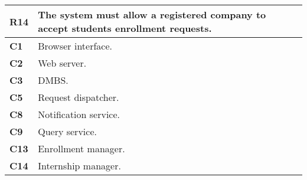 \begin{table}[H]
    \centering
    \begin{tabular}{|l|m{10cm}|}
        \hline \textbf{R14} & The system must allow a registered company to accept students enrollment requests.\\
        \hline \textbf{C1} & Browser interface. \\
        \hline \textbf{C2} & Web server. \\
        \hline \textbf{C3} & DMBS. \\
        \hline \textbf{C5} & Request dispatcher. \\
        \hline \textbf{C8} & Notification service. \\
        \hline \textbf{C9} & Query service. \\
        \hline \textbf{C13} & Enrollment manager. \\
        \hline \textbf{C14} & Internship manager. \\
        \hline
    \end{tabular}
\end{table}

